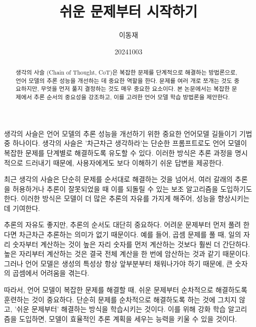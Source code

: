 \documentclass[11pt, oneside]{article}   	%
\title{쉬운 문제부터 시작하기}
\author{이동재}
\date{20241003}
\begin{document}
\maketitle


\begin{abstract}
  생각의 사슬 (Chain of Thought, CoT)은 복잡한 문제를 단계적으로 해결하는 방법론으로, 언어 모델의 추론 성능을 개선하는 데 중요한 역할을 한다. 문제를 여러 개로 쪼개는 것도 중요하지만, 무엇을 먼저 풀지 결정하는 것도 매우 중요한 요소이다. 본 논문에서는 복잡한 문제에서 추론 순서의 중요성을 강조하고, 이를 고려한 언어 모델 학습 방법론을 제안한다.
\end{abstract}
  생각의 사슬은 언어 모델의 추론 성능을 개선하기 위한 중요한 언어모델 길들이기 기법 중 하나이다. 생각의 사슬은 '차근차근 생각하라'는 단순한 프롬프트로도 언어 모델이 복잡한 문제를 단계별로 해결하도록 유도할 수 있다. 이러한 방식은 추론 과정을 명시적으로 드러내기 때문에, 사용자에게도 보다 이해하기 쉬운 답변을 제공한다.

  최근 생각의 사슬은 단순히 문제를 순서대로 해결하는 것을 넘어서, 여러 갈래의 추론을 허용하거나 추론이 잘못되었을 때 이를 되돌릴 수 있는 보조 알고리즘을 도입하기도 한다. 이러한 방식은 모델이 더 많은 추론의 자유를 가지게 해주어, 성능을 향상시키는 데 기여한다.

  추론의 자유도 좋지만, 추론의 순서도 대단히 중요하다. 어려운 문제부터 먼저 풀려 한다면 차근차근 추론하는 의미가 없기 때문이다. 예를 들어, 곱셈 문제를 풀 때, 일의 자리 숫자부터 계산하는 것이 높은 자리 숫자를 먼저 계산하는 것보다 훨씬 더 간단하다. 높은 자리부터 계산하는 것은 결국 전체 계산을 한 번에 암산하는 것과 같기 때문이다. 그러나 언어 모델은 생성의 특성상 항상 앞부분부터 채워나가야 하기 때문에, 큰 숫자의 곱셈에서 어려움을 겪는다.

  따라서, 언어 모델이 복잡한 문제를 해결할 때, 쉬운 문제부터 순차적으로 해결하도록 훈련하는 것이 중요하다. 단순히 문제를 순차적으로 해결하도록 하는 것에 그치지 않고, '쉬운 문제부터' 해결하는 방식을 학습시키는 것이다. 이를 위해 강화 학습 알고리즘을 도입하면, 모델이 효율적인 추론 계획을 세우는 능력을 키울 수 있을 것이다.
\end{document}
